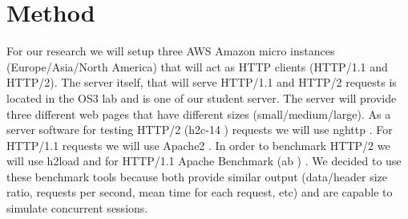 \section{Method}
\label{method}
For our research we will setup three AWS Amazon  micro instances (Europe/Asia/North America) that will act as HTTP clients (HTTP/1.1 and HTTP/2). The server itself, that will serve HTTP/1.1 and HTTP/2 requests is located in the OS3 lab and is one of our student server. The server will provide three different web  pages that have different sizes (small/medium/large). As a server software for testing HTTP/2 (h2c-14 \cite{h2c-14}) requests we will use nghttp \cite{nghttp}. For HTTP/1.1 requests we will use Apache2 \cite{apache2}. In order to benchmark HTTP/2 we will use h2load \cite{h2load} and for HTTP/1.1 Apache Benchmark (ab \cite{ab}) . We decided to use these benchmark tools because both provide similar output (data/header size ratio, requests per second, mean time for each request, etc) and are capable to simulate concurrent sessions.

